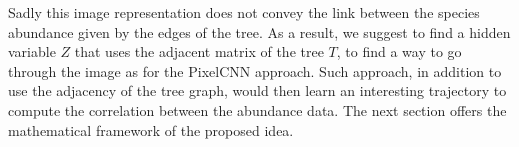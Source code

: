Sadly this image representation does not convey the link between the species abundance given by the edges of the tree.
As a result, we suggest to find a hidden variable $Z$ that uses the adjacent matrix of the tree $T$, to find a way to go through the image
as for the PixelCNN approach.
Such approach, in addition to use the adjacency of the tree graph, would then learn an interesting trajectory to compute the correlation between the abundance data.
The next section offers the mathematical framework of the proposed idea.
